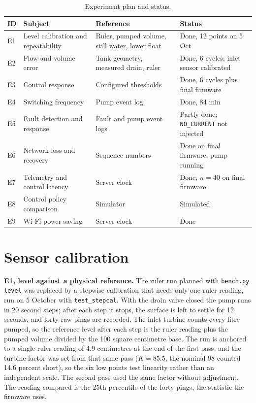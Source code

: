 \begin{table}[H]
\caption{Experiment plan and status.}
\label{tab:expsummary}
\centering
\renewcommand{\arraystretch}{1.05}
\begin{tabular}{|p{0.7cm}|>{\raggedright\arraybackslash}p{4.0cm}|>{\raggedright\arraybackslash}p{4.2cm}|>{\raggedright\arraybackslash}p{3.8cm}|}
\hline
\textbf{ID} & \textbf{Subject} & \textbf{Reference} & \textbf{Status} \\
\hline
E1 & Level calibration and repeatability & Ruler, pumped volume, still water, lower float & Done, 12 points on 5 Oct \\
\hline
E2 & Flow and volume error & Tank geometry, measured drain, ruler & Done, 6 cycles; inlet sensor calibrated \\
\hline
E3 & Control response & Configured thresholds & Done, 6 cycles plus final firmware \\
\hline
E4 & Switching frequency & Pump event log & Done, 84 min \\
\hline
E5 & Fault detection and response & Fault and pump event logs & Partly done; \texttt{NO\_CURRENT} not injected \\
\hline
E6 & Network loss and recovery & Sequence numbers & Done on final firmware, pump running \\
\hline
E7 & Telemetry and control latency & Server clock & Done, $n = 40$ on final firmware \\
\hline
E8 & Control policy comparison & Simulator & Simulated \\
\hline
E9 & Wi-Fi power saving & Server clock & Done \\
\hline
\end{tabular}
\end{table}

\section{Sensor calibration}
\label{sec:o8-2}

\textbf{E1, level against a physical reference.} The ruler run planned with \texttt{bench.py level} was replaced by a stepwise calibration that needs only one ruler reading, run on 5 October with \texttt{test\_stepcal}. With the drain valve closed the pump runs in 20 second steps; after each step it stops, the surface is left to settle for 12 seconds, and forty raw pings are recorded. The inlet turbine counts every litre pumped, so the reference level after each step is the ruler reading plus the pumped volume divided by the 100 square centimetre base. The run is anchored to a single ruler reading of 4.9 centimetres at the end of the first pass, and the turbine factor was set from that same pass ($K = 85.5$, the nominal 98 counted 14.6 percent short), so the six low points test linearity rather than an independent scale. The second pass used the same factor without adjustment. The reading compared is the 25th percentile of the forty pings, the statistic the firmware uses.

